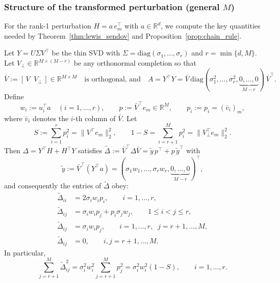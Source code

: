 \subsubsection{Structure of the transformed perturbation (general $M$)}

For the rank-1 perturbation $H = a \, e_m^\top$ with $a \in \mathbb{R}^d$, we compute the key quantities needed by Theorem~\ref{thm:lewis_sendov} and Proposition~\ref{prop:chain_rule}.

\begin{lemma}
\label{lem:delta_tilde_general}
Let $Y = U \Sigma V^\top$ be the thin SVD with $\Sigma=\mathrm{diag}(\sigma_1,\ldots,\sigma_r)$ and $r=\min\{d,M\}$.  Let $V_\perp\in\mathbb{R}^{M\times(M-r)}$ be any orthonormal completion so that
\begin{equation}
\bar V := [\,V \;\; V_\perp\,]\in\mathbb{R}^{M\times M} \quad \text{is orthogonal, and}\quad
A=Y^\top Y = \bar V \,\mathrm{diag}(\sigma_1^2,\ldots,\sigma_r^2,\underbrace{0,\ldots,0}_{M-r})\,\bar V^\top.
\end{equation}
Define
\begin{equation}
w_i := u_i^\top a \quad (i=1,\ldots,r), \qquad
p := \bar V^\top e_m \in \mathbb{R}^M, \qquad
p_i := p_i = (\bar v_i)_m,
\end{equation}
where $\bar v_i$ denotes the $i$-th column of $\bar V$.  Let
\begin{equation}
S := \sum_{i=1}^{r} p_i^2 = \|V^\top e_m\|_2^2, \qquad
1-S = \sum_{i=r+1}^{M} p_i^2 = \|V_\perp^\top e_m\|_2^2.
\label{eq:S_def}
\end{equation}
Then $\Delta=Y^\top H + H^\top Y$ satisfies $\tilde{\Delta} := \bar V^\top \Delta \bar V = \tilde y\,p^\top + p\,\tilde y^\top$ with
\begin{equation}
\tilde y := \bar V^\top (Y^\top a) = (\sigma_1 w_1,\ldots,\sigma_r w_r,\underbrace{0,\ldots,0}_{M-r})^\top,
\end{equation}
and consequently the entries of $\tilde\Delta$ obey:
\begin{align}
\tilde{\Delta}_{ii} &= 2 \sigma_i w_i p_i, \qquad i=1,\ldots,r, \label{eq:delta_rr_diag}\\
\tilde{\Delta}_{ij} &= \sigma_i w_i p_j + p_i \sigma_j w_j, \qquad 1\leq i<j \leq r, \label{eq:delta_rr_off}\\
\tilde{\Delta}_{i j} &= \sigma_i w_i p_j, \qquad i=1,\ldots,r,\;\; j=r+1,\ldots,M, \label{eq:delta_rnull}\\
\tilde{\Delta}_{ij} &= 0, \qquad i,j=r+1,\ldots,M. \label{eq:delta_nullnull}
\end{align}
In particular,
\begin{equation}
\sum_{j=r+1}^{M} \tilde{\Delta}_{ij}^2
= \sigma_i^2 w_i^2 \sum_{j=r+1}^{M} p_j^2
= \sigma_i^2 w_i^2 (1-S), \qquad i=1,\ldots,r.
\label{eq:delta_rnull_sum}
\end{equation}
\end{lemma}

